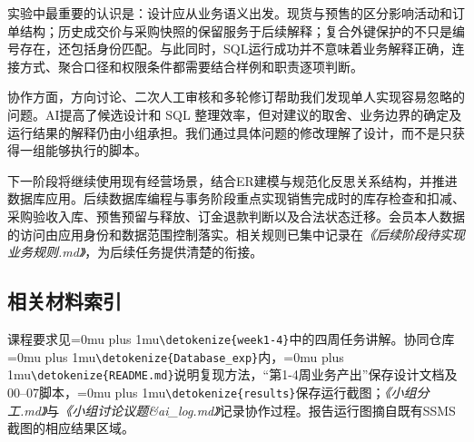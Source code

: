 \documentclass{SYSUReport}
\newcommand{\code}[1]{\begingroup\Urlmuskip=0mu plus 1mu\expandafter\nolinkurl\expandafter{\detokenize{#1}}\endgroup}
\newcommand{\docref}[1]{\textit{《#1》}}
\begin{document}
实验中最重要的认识是：设计应从业务语义出发。现货与预售的区分影响活动和订单结构；历史成交价与采购快照的保留服务于后续解释；复合外键保护的不只是编号存在，还包括身份匹配。与此同时，SQL运行成功并不意味着业务解释正确，连接方式、聚合口径和权限条件都需要结合样例和职责逐项判断。

协作方面，方向讨论、二次人工审核和多轮修订帮助我们发现单人实现容易忽略的问题。AI提高了候选设计和 SQL 整理效率，但对建议的取舍、业务边界的确定及运行结果的解释仍由小组承担。我们通过具体问题的修改理解了设计，而不是只获得一组能够执行的脚本。

下一阶段将继续使用现有经营场景，结合ER建模与规范化反思关系结构，并推进数据库应用。后续数据库编程与事务阶段重点实现销售完成时的库存检查和扣减、采购验收入库、预售预留与释放、订金退款判断以及合法状态迁移。会员本人数据的访问由应用身份和数据范围控制落实。相关规则已集中记录在\docref{后续阶段待实现业务规则.md}，为后续任务提供清楚的衔接。

\subsection*{相关材料索引}
课程要求见\code{week1-4}中的四周任务讲解。协同仓库\code{Database_exp}内，\code{README.md}说明复现方法，“第1-4周业务产出”保存设计文档及00--07脚本，\code{results}保存运行截图；\docref{小组分工.md}与\docref{小组讨论议题\&ai\_log.md}记录协作过程。报告运行图摘自既有SSMS截图的相应结果区域。
\end{document}

